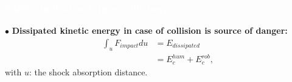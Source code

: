 



\begin{frame}
\frametitle{{\textcolor{white}{\hspace{0.2cm}Safety indicator 1 (pre-collision)}}}


$\bullet$ \textbf{Dissipated {\color{teal}kinetic energy} in case of {\color{red}collision} is source of {\color{red}danger}:}
\begin{equation}
\begin{split}
\int_u F_{impact} du  & = E_{dissipated} \\
                      & = E_{c}^{hum} + E_{c}^{rob},
\end{split}
\label{eq:Energydissipationmodel}
\end{equation}
\hspace{3mm} with $u$: the shock absorption distance.


\vspace{5mm}

%


\end{frame}












